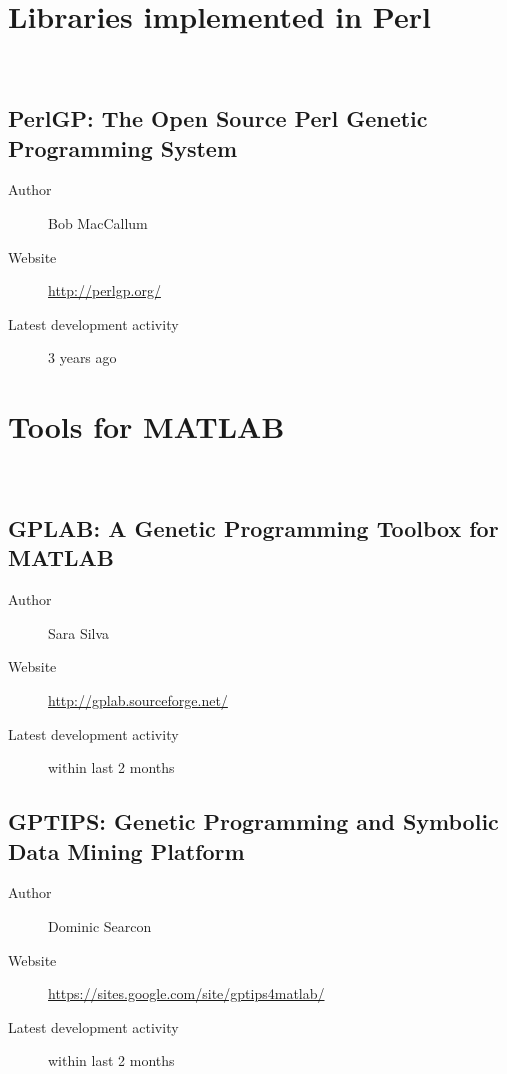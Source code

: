 \section{Libraries implemented in Perl}~\label{section:libraries-perl}
\subsection*{PerlGP: The Open Source Perl Genetic Programming System}
\begin{description}
    \item[Author] Bob MacCallum
    \item[Website] \url{http://perlgp.org/}
    \item[Latest development activity] 3 years ago
\end{description}


\section{Tools for MATLAB}~\label{section:libraries-matlab}
\subsection*{GPLAB: A Genetic Programming Toolbox for MATLAB}
\begin{description}
    \item[Author] Sara Silva
    \item[Website] \url{http://gplab.sourceforge.net/}
    \item[Latest development activity] within last 2 months
\end{description}


\subsection*{GPTIPS: Genetic Programming and Symbolic Data Mining Platform}
\begin{description}
    \item[Author] Dominic Searcon
    \item[Website] \url{https://sites.google.com/site/gptips4matlab/}
    \item[Latest development activity] within last 2 months
\end{description}

